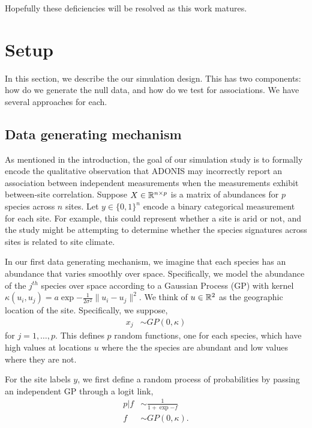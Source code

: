 \documentclass{article}
\begin{document}
Hopefully these deficiencies will be resolved as this work matures.

\section{Setup}
\label{sec:setup}

In this section, we describe the our simulation design. This has two components:
how do we generate the null data, and how do we test for associations. We have
several approaches for each.

\subsection{Data generating mechanism}
\label{subsec:data_generating_mechanism}

As mentioned in the introduction, the goal of our simulation study is to
formally encode the qualitative observation that ADONIS may incorrectly report
an association between independent measurements when the measurements exhibit
between-site correlation. Suppose $X \in \mathbb{R}^{n \times p}$ is a matrix of
abundances for $p$ species across $n$ sites. Let $y \in \{0, 1\}^{n}$ encode a
binary categorical measurement for each site. For example, this could represent
whether a site is arid or not, and the study might be attempting to determine
whether the species signatures across sites is related to site climate.

In our first data generating mechanism, we imagine that each species has an
abundance that varies smoothly over space. Specifically, we model the abundance
of the $j^{th}$ species over space according to a Gaussian Process (GP) with
kernel
$\kappa\left(u_{i}, u_{j}\right) = a\exp{-\frac{1}{2\sigma^{2}}\|u_{i} - u_{j}\|^{2}}$.
We think of $u \in \mathbb{R}^{2}$ as the geographic location of the site.
Specifically, we suppose,
\begin{align}
  x_{j} &\sim GP\left(0, \kappa\right)
\end{align}
for $j = 1, \dots, p$. This defines $p$ random functions, one for each species,
which have high values at locations $u$ where the the species are abundant and
low values where they are not.

For the site labels $y$, we first define a random process of probabilities by
passing an independent GP through a logit link,
\begin{align}
  p \vert f &\sim \frac{1}{1 + \exp{-f}} \\
  f &\sim GP\left(0, \kappa\right).
\end{align}
\end{document}
